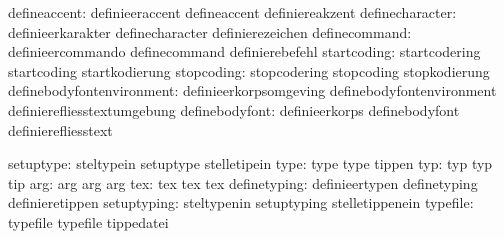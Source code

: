                  defineaccent:  definieeraccent              defineaccent
                                definiereakzent
              definecharacter:  definieerkarakter            definecharacter
                                definierezeichen
                definecommand:  definieercommando            definecommand
                                definierebefehl
                  startcoding:  startcodering                startcoding
                                startkodierung
                   stopcoding:  stopcodering                 stopcoding
                                stopkodierung
    definebodyfontenvironment:  definieerkorpsomgeving       definebodyfontenvironment
                                definierefliesstextumgebung
               definebodyfont:  definieerkorps               definebodyfont
                                definierefliesstext

                    setuptype:  steltypein                   setuptype
                                stelletipein
                         type:  type                         type
                                tippen
                          typ:  typ                          typ
                                tip
                          arg:  arg                          arg
                                arg
                          tex:  tex                          tex
                                tex
                 definetyping:  definieertypen               definetyping
                                definieretippen
                  setuptyping:  steltypenin                  setuptyping
                                stelletippenein
                     typefile:  typefile                     typefile
                                tippedatei

